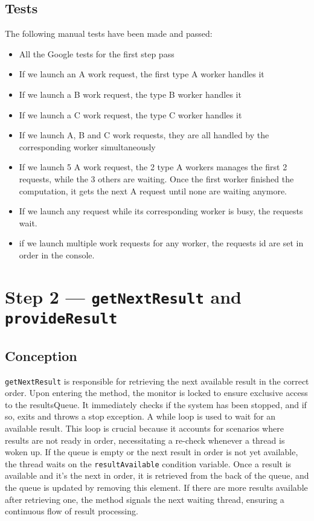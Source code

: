 \documentclass{article}
\begin{document}
    \subsection*{Tests}

    The following manual tests have been made and passed:

    \begin{itemize}
        \item All the Google tests for the first step pass
        \item If we launch an A work request, the first type A worker handles it
        \item If we launch a B work request, the type B worker handles it
        \item If we launch a C work request, the type C worker handles it
        \item If we launch A, B and C work requests, they are all handled by the corresponding worker simultaneously
        \item If we launch 5 A work request, the 2 type A workers manages the first 2 requests, while the 3 others are waiting. Once the first worker finished the computation, it gets the next A request until none are waiting anymore.
        \item If we launch any request while its corresponding worker is busy, the requests wait.
        \item if we launch multiple work requests for any worker, the requests id are set in order in the console.
    \end{itemize}

    \section*{Step 2 --- \texttt{getNextResult} and \texttt{provideResult}}
    \subsection*{Conception}

    \texttt{getNextResult} is responsible for retrieving the next available result in the correct order.
    Upon entering the method, the monitor is locked to ensure exclusive access to the resultsQueue.
    It immediately checks if the system has been stopped, and if so, exits and throws a stop exception.
    A while loop is used to wait for an available result.
    This loop is crucial because it accounts for scenarios where results are not ready in order, necessitating a re-check whenever a thread is woken up.
    If the queue is empty or the next result in order is not yet available, the thread waits on the \texttt{resultAvailable} condition variable.
    Once a result is available and it's the next in order, it is retrieved from the back of the queue, and the queue is updated by removing this element.
    If there are more results available after retrieving one, the method signals the next waiting thread, ensuring a continuous flow of result processing.
\end{document}
